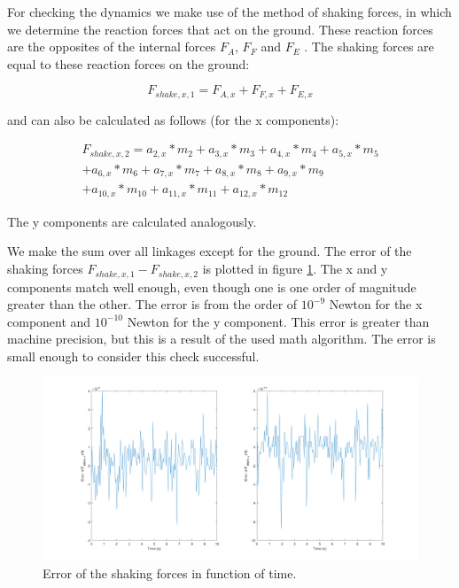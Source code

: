 \documentclass[a4paper]{article}
\begin{document}
For checking the dynamics we make use of the method of shaking forces, in which we determine the reaction forces that act on the ground. These reaction forces are the opposites of the internal forces \(F_A\), \(F_F\) and \(F_E\) . The shaking forces are equal to these reaction forces on the ground: 

\begin{equation}
	F_{shake,x,1} = F_{A,x} + F_{F,x} + F_{E,x}
\end{equation}

and can also be calculated as follows (for the x components):

\begin{equation}
\begin{split}
	F_{shake,x,2} =  a_{2,x}*m_2 + a_{3,x}*m_3 + a_{4,x}*m_4 + a_{5,x}*m_5 \\ 
	 +a_{6,x}*m_6	+ a_{7,x}*m_7 + a_{8,x}*m_8 + a_{9,x}*m_9 \\
	 + a_{10,x}*m_{10} + a_{11,x}*m_{11} + a_{12,x}*m_{12}
\end{split}
\end{equation}

The y components are calculated analogously.

We make the sum over all linkages except for the ground. The error of the shaking forces \(F_{shake,x,1}-F_{shake,x,2}\) is plotted in  figure \ref{fig:contrdyn}. The x and y components match well enough, even though one is one order of magnitude greater than the other. The error is from the order of \(10^{-9}\) Newton for the x component and \(10^{-10}\) Newton for the y component. This error is greater than machine precision, but this is a result of the used math algorithm. The error is small enough to consider this check successful.

\clearpage

\begin{figure}
	\centering
	
	\includegraphics[width = \textwidth]{contrdyn.png}
	
	\caption{Error of the shaking forces in function of time.}
	\label{fig:contrdyn}
	
\end{figure}
\end{document}
